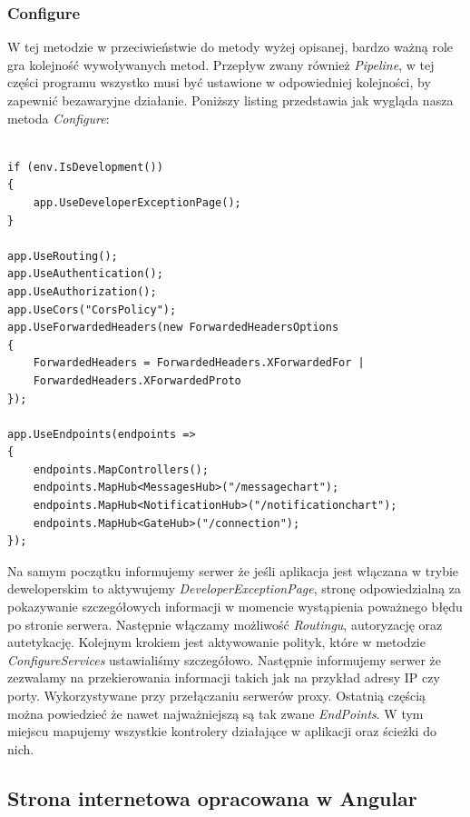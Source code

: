 \documentclass[12pt,a4paper]{article}
\begin{document}
\subsubsection{Configure}

\hspace*{0.7cm} W tej metodzie w przeciwieństwie do metody wyżej opisanej, bardzo ważną role gra kolejność wywoływanych metod. Przepływ zwany również \textit{Pipeline}, w tej części programu wszystko musi być ustawione w odpowiedniej kolejności, by zapewnić bezawaryjne działanie. Poniższy listing przedstawia jak wygląda nasza metoda \textit{Configure}:\newline

\begin{lstlisting}[caption={Metoda Configure}]

if (env.IsDevelopment())
{
	app.UseDeveloperExceptionPage();
}

app.UseRouting();
app.UseAuthentication();
app.UseAuthorization();
app.UseCors("CorsPolicy");
app.UseForwardedHeaders(new ForwardedHeadersOptions
{
	ForwardedHeaders = ForwardedHeaders.XForwardedFor |
	ForwardedHeaders.XForwardedProto
});

app.UseEndpoints(endpoints =>
{
	endpoints.MapControllers();
	endpoints.MapHub<MessagesHub>("/messagechart");
	endpoints.MapHub<NotificationHub>("/notificationchart");
	endpoints.MapHub<GateHub>("/connection");
});
\end{lstlisting}

\hspace*{0.7cm} Na samym początku informujemy serwer że jeśli aplikacja jest włączana w trybie deweloperskim to aktywujemy \textit{DeveloperExceptionPage}, stronę odpowiedzialną za pokazywanie szczegółowych informacji w momencie wystąpienia poważnego błędu po stronie serwera. Następnie włączamy możliwość \textit{Routingu}, autoryzację oraz autetykację. Kolejnym krokiem jest aktywowanie polityk, które w metodzie \textit{ConfigureServices} ustawialiśmy szczegółowo. Następnie informujemy serwer że zezwalamy na przekierowania informacji takich jak na przykład adresy IP czy porty. Wykorzystywane przy przełączaniu serwerów proxy. Ostatnią częścią można powiedzieć że nawet najważniejszą są tak zwane \textit{EndPoints}. W tym miejscu mapujemy wszystkie kontrolery działające w aplikacji oraz ścieżki do nich.

\subsection{Strona internetowa opracowana w Angular}
\end{document}
